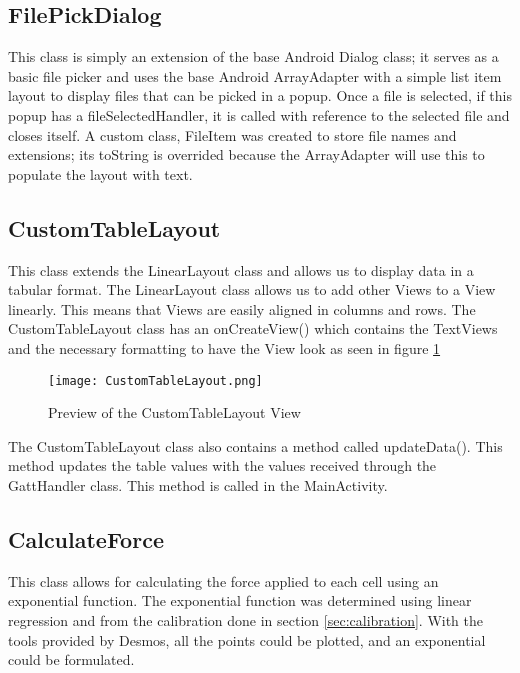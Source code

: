 \subsection{FilePickDialog}

This class is simply an extension of the base Android Dialog class; it serves as a basic file picker and uses the base Android ArrayAdapter with a simple list item layout to display files that can be picked in a popup. Once a file is selected, if this popup has a fileSelectedHandler, it is called with reference to the selected file and closes itself. A custom class, FileItem was created to store file names and extensions; its toString is overrided because the ArrayAdapter will use this to populate the layout with text.
\clearpage
\subsection{CustomTableLayout}
This class extends the LinearLayout class and allows us to display data in a tabular format. The LinearLayout class allows us to add other Views to a View linearly. This means that Views are easily aligned in columns and rows. The CustomTableLayout class has an onCreateView() which contains the TextViews and the necessary formatting to have the View look as seen in figure \ref{fig:customtable}

\begin{figure}[!htb]
  \centering
  \texttt{[image: CustomTableLayout.png]}
  \caption{Preview of the CustomTableLayout View}
  \label{fig:customtable}
\end{figure}

The CustomTableLayout class also contains a method called updateData(). This method updates the table values with the values received through the GattHandler class. This method is called in the MainActivity.
\clearpage
\subsection{CalculateForce}
This class allows for calculating the force applied to each cell using an exponential function. The exponential function was determined using linear regression and from the calibration done in section \ref{sec:calibration}. With the tools provided by Desmos\cite{desmos}, all the points could be plotted, and an exponential could be formulated.
 
